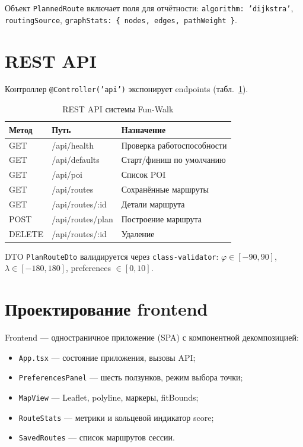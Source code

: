 Объект \texttt{PlannedRoute} включает поля для отчётности: \texttt{algorithm:
'dijkstra'}, \texttt{routingSource}, \texttt{graphStats: \{ nodes, edges, pathWeight \}}.

\section{REST API}

Контроллер \texttt{@Controller('api')} экспонирует endpoints (табл.~\ref{tab:api}).

\begin{table}[H]
\centering
\caption{REST API системы Fun-Walk}
\label{tab:api}
\begin{tabular}{@{}llp{7cm}@{}}
\toprule
\textbf{Метод} & \textbf{Путь} & \textbf{Назначение} \\
\midrule
GET & /api/health & Проверка работоспособности \\
GET & /api/defaults & Старт/финиш по умолчанию \\
GET & /api/poi & Список POI \\
GET & /api/routes & Сохранённые маршруты \\
GET & /api/routes/:id & Детали маршрута \\
POST & /api/routes/plan & Построение маршрута \\
DELETE & /api/routes/:id & Удаление \\
\bottomrule
\end{tabular}
\end{table}

DTO \texttt{PlanRouteDto} валидируется через \texttt{class-validator}:
$\varphi \in [-90, 90]$, $\lambda \in [-180, 180]$, preferences $\in [0, 10]$.

\section{Проектирование frontend}

Frontend --- одностраничное приложение (SPA) с компонентной декомпозицией:

\begin{itemize}
  \item \texttt{App.tsx} --- состояние приложения, вызовы API;
  \item \texttt{PreferencesPanel} --- шесть ползунков, режим выбора точки;
  \item \texttt{MapView} --- Leaflet, polyline, маркеры, fitBounds;
  \item \texttt{RouteStats} --- метрики и кольцевой индикатор score;
  \item \texttt{SavedRoutes} --- список маршрутов сессии.
\end{itemize}

